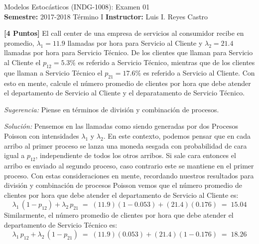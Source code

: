 \documentclass[ a4paper, twoside, 11pt]{article}
\newcommand{\numero}{01}
\begin{document}
\allowdisplaybreaks

\begin{center}
\Large Modelos Estoc\'asticos (INDG-1008): Examen \numero \\[1ex]
\small \textbf{Semestre:} 2017-2018 T\'ermino I \qquad
\textbf{Instructor:} Luis I. Reyes Castro
\end{center}
\fullskip




\begin{problem}
\textbf{[4 Puntos]} El call center de una empresa de servicios al consumidor recibe en promedio, $\lambda_1 = 11.9$ llamadas por hora para Servicio al Cliente y $\lambda_2 = 21.4$ llamadas por hora para Servicio T\'ecnico. De los clientes que llaman para Servicio al Cliente el $p_{12} = 5.3\%$ es referido a Servicio T\'ecnico, mientras que de los clientes que llaman a Servicio T\'ecnico el $p_{21} = 17.6\%$ es referido a Servicio al Cliente. Con esto en mente, calcule el n\'umero promedio de clientes por hora que debe atender el departamento de Servicio al Cliente y el deparatamento de Servicio T\'ecnico. 

\emph{Sugerencia:} Piense en t\'erminos de divisi\'on y combinaci\'on de procesos. 

\emph{Soluci\'on:} Pensemos en las llamadas como siendo generadas por dos Procesos Poisson con intensidades $\lambda_1$ y $\lambda_2$. En este contexto, podemos pensar que en cada arribo al primer proceso se lanza una moneda sesgada con probabilidad de cara igual a $p_{12}$, independiente de todos los otros arribos. Si sale cara entonces el arribo es enviado al segundo proceso, caso contrario este se mantiene en el primer proceso. Con estas consideraciones en mente, recordando nuestros resultados para divisi\'on y combinaci\'on de procesos Poisson vemos que el n\'umero promedio de clientes por hora que debe atender el departamento de Servicio al Cliente es: 
\[
\lambda_1 \, ( 1 - p_{12} ) + \lambda_2 \, p_{21} \; = \;
(11.9)(1-0.053) + (21.4)(0.176) \; = \; 15.04
\]
Similarmente, el n\'umero promedio de clientes por hora que debe atender el departamento de Servicio T\'ecnico es: 
\[
\lambda_1 \, p_{12} + \lambda_2 \, ( 1 - p_{21} ) \; = \;
(11.9)(0.053) + (21.4)(1-0.176) \; = \; 18.26
\]

\end{problem}
\vspace{\baselineskip}
\end{document}
